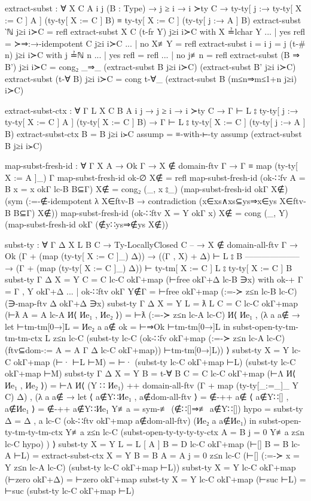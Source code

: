 \documentclass[logo,bsc,singlespacing,parskip,online]{infthesis}
\renewenvironment{code}{\mintedcopy[breaklines,breaksymbolleft=\;]{agda}}{\endmintedcopy}
\begin{document}
\begin{code}
  extract-subst : ∀ {X C A i j}
    (B : Type)
    → j ≥ i
    → i ≻ty C
    → ty-ty[ j :→ ty-ty[ X := C ] A ] (ty-ty[ X := C ] B)
        ≡ ty-ty[ X := C ] (ty-ty[ j :→ A ] B)
  extract-subst ‵ℕ j≥i i≻C = refl
  extract-subst {X} {C} (t-fr Y) j≥i i≻C with X ≟lchar Y
  ... | yes refl = ≻⇒:→-idempotent C j≥i i≻C
  ... | no  X≢Y  = refl
  extract-subst {i = i} {j = j} (t-# n) j≥i i≻C with j ≟ℕ n
  ... | yes refl = refl
  ... | no  j≢n  = refl
  extract-subst (B ⇒ B') j≥i i≻C = cong₂ _⇒_
    (extract-subst B j≥i i≻C) (extract-subst B' j≥i i≻C)
  extract-subst (t-∀ B) j≥i i≻C = cong t-∀_ (extract-subst B (m≤n⇒m≤1+n j≥i) i≻C)

  extract-subst-ctx : ∀ {Γ L X C B A i j}
    → j ≥ i
    → i ≻ty C
    → Γ ⊢ L ⦂ ty-ty[ j :→ ty-ty[ X := C ] A ] (ty-ty[ X := C ] B)
    → Γ ⊢ L ⦂ ty-ty[ X := C ] (ty-ty[ j :→ A ] B)
  extract-subst-ctx {B = B} j≥i i≻C assump = ≡-with-⊢-ty assump (extract-subst B j≥i i≻C)

  map-subst-fresh-id : ∀ {Γ X A} → Ok Γ → X ∉ domain-ftv Γ → Γ ≡ map (ty-ty[ X := A ]_) Γ
  map-subst-fresh-id ok-∅ X∉ = refl
  map-subst-fresh-id (ok-∷fv {A = B} {x = x} okΓ lc-B B⊆Γ) X∉ =
    cong₂ (_, x ⦂_)
    (map-subst-fresh-id okΓ X∉)
    (sym (:=-∉-idempotent λ X∈ftv-B → contradiction (x∈xs∧xs⊆ys⇒x∈ys X∈ftv-B B⊆Γ) X∉))
  map-subst-fresh-id (ok-∷ftv {X = Y} okΓ x) X∉ = cong (_, Y) (map-subst-fresh-id okΓ (∉y∷ys⇒∉ys X∉))

  subst-ty : ∀ {Γ Δ X L B C}
    → Ty-LocallyClosed C
    -- → X ∉ domain-all-ftv Γ
    → Ok (Γ + (map (ty-ty[ X := C ]_) Δ))
    → ((Γ , X) + Δ) ⊢ L ⦂ B
      --------------------
    → (Γ + (map (ty-ty[ X := C ]_) Δ)) ⊢ ty-tm[ X := C ] L ⦂ ty-ty[ X := C ] B
  subst-ty {Γ} {Δ} {X = Y} {C = C} lc-C okΓ+map (⊢free okΓ+Δ lc-B ∋x)
    with ok-+ {Γ = Γ , Y} okΓ+Δ
  ... | ok-∷ftv okΓ Y∉Γ = ⊢free okΓ+map (:=-≻ z≤n lc-B lc-C) (∋-map-ftv Δ okΓ+Δ ∋x)
  subst-ty {Γ} {Δ} {X = Y} {L = ƛ L} {C = C} lc-C okΓ+map (⊢ƛ {A = A} lc-A И⟨ Иe₁ , Иe₂ ⟩) =
    ⊢ƛ (:=-≻ z≤n lc-A lc-C) И⟨ Иe₁ , (λ a {a∉} →
      let ⊢tm-tm[0→]L = Иe₂ a {a∉}
          ok = ⊢⇒Ok ⊢tm-tm[0→]L
      in subst-open-ty-tm-tm-tm-ctx L z≤n lc-C
        (subst-ty
          lc-C
          (ok-∷fv
            okΓ+map
            (:=-≻ z≤n lc-A lc-C)
            (ftv⊆dom-:= {A = A} Γ Δ lc-C okΓ+map))
          ⊢tm-tm[0→]L)) ⟩
  subst-ty {X = Y} lc-C okΓ+map (⊢· ⊢L ⊢M) = ⊢· (subst-ty lc-C okΓ+map ⊢L) (subst-ty lc-C okΓ+map ⊢M)
  subst-ty {Γ} {Δ} {X = Y} {B = t-∀ B} {C = C} lc-C okΓ+map (⊢Λ И⟨ Иe₁ , Иe₂ ⟩) =
    ⊢Λ И⟨ (Y ∷ Иe₁) ++ domain-all-ftv (Γ + map (ty-ty[_:=_]_ Y C) Δ) , (λ a {a∉} →
      let ⟨ a∉Y∷Иe₁ , a∉dom-all-ftv ⟩ = ∉-++ a∉
          ⟨ a∉Y∷[] , a∉Иe₁ ⟩ = ∉-++ a∉Y∷Иe₁
          Y≢a = sym-≢ (∉∷[]⇒≢ a∉Y∷[])
          hypo = subst-ty {Δ = Δ , a} lc-C (ok-∷ftv okΓ+map a∉dom-all-ftv) (Иe₂ a {a∉Иe₁})
      in subst-open-ty-tm-ty-tm-ctx Y≢a z≤n lc-C
        (subst-open-ty-ty-ty-ty-ctx {A = B} {j = 0} Y≢a z≤n lc-C hypo) ) ⟩
  subst-ty {X = Y} {L = L [ A ]} {B = D} lc-C okΓ+map (⊢[] {B = B} lc-A ⊢L) =
    extract-subst-ctx {X = Y} {B = B} {A = A} {j = 0} z≤n lc-C
      (⊢[] (:=-≻ {x = Y} z≤n lc-A lc-C) (subst-ty lc-C okΓ+map ⊢L))
  subst-ty {X = Y} lc-C okΓ+map (⊢zero okΓ+Δ) = ⊢zero okΓ+map
  subst-ty {X = Y} lc-C okΓ+map (⊢suc ⊢L) = ⊢suc (subst-ty lc-C okΓ+map ⊢L)


\end{code}
\end{document}
